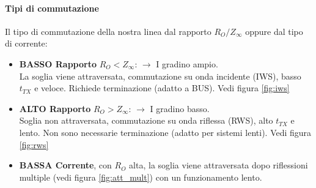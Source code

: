 \documentclass[12pt]{article}
\begin{document}
\paragraph{Tipi di commutazione}
Il tipo di commutazione della nostra linea dal rapporto $R_{O}/Z_{\infty}$ oppure dal tipo di corrente:
\begin{itemize}
  \item \textbf{BASSO Rapporto} $R_{O}<Z_{\infty}$: $\rightarrow$ I gradino ampio.\\ La soglia viene attraversata, commutazione su onda incidente (IWS), basso $t_{TX}$ e veloce. Richiede terminazione (adatto a BUS). Vedi figura \ref{fig:iws}
  \item \textbf{ALTO Rapporto} $R_{O}>Z_{\infty}$: $\rightarrow$ I gradino basso.\\ Soglia non attraversata, commutazione su onda riflessa (RWS), alto $t_{TX}$ e lento. Non sono necessarie terminazione (adatto per sistemi lenti). Vedi figura \ref{fig:rws}
  \item \textbf{BASSA Corrente}, con $R_{O}$ alta, la soglia viene attraversata dopo riflessioni multiple (vedi figura \ref{fig:att_mult}) con un funzionamento lento.
\end{itemize}
\end{document}

